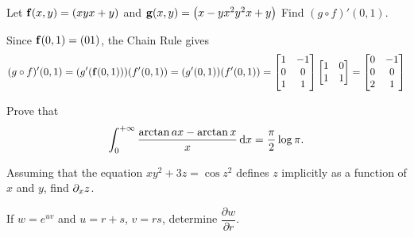 \begin{multicols}{2}
\begin{problem}
Let $\mathbf{ f}(x,y) = \left( xy \\ x+y \right)$ and $\mathbf{ g}(x,y) =\left( x-y \\ x^2y^2
\\ x+y \right)$ Find $(g\circ f)'(0,1)$.
\begin{answer}
Since $\mathbf{ f}(0,1) = \left( 0\\ 1 \right)$, the Chain Rule gives
$$(g\circ f)'(0,1) = (g'(\mathbf{ f}(0,1)))(f'(0,1)) = (g'(0,1))(f'(0,1)) =\begin{bmatrix} 1 & -1\\ 0 &
0 \\ 1 & 1 \\
\end{bmatrix}\begin{bmatrix} 1 & 0\\ 1 & 1
\end{bmatrix} = \begin{bmatrix} 0 & -1\\ 0 & 0 \\ 2 & 1 \\
\end{bmatrix}   $$

\end{answer}

\end{problem}

% 
\begin{problem}
Prove that  $$\dint _0 ^{+\infty} \dfrac{\arctan ax - \arctan
x}{x}\d{x}=\dfrac{\pi}{2}\log \pi.$$
\end{problem}
\begin{problem}
Assuming that the equation $xy^2 + 3z = \cos z^2$ defines $z$
implicitly as a function of $x$ and $y$, find $\partial_x z$.
\end{problem}
\begin{problem}
If $w = e^{uv}$ and $u = r + s$, $v = rs$,
 determine $\dfrac{\partial{w}}{\partial{r}}$.
\end{problem}


\end{multicols}

